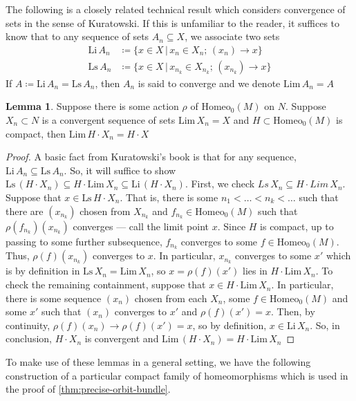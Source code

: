 \documentclass[10pt, oneside]{article}
\newcommand{\homeo}[1][S^1]{\text{Homeo}_0(#1)}
\newcommand{\klim}[1]{\text{Lim}\,#1}
\newcommand{\li}[1]{\text{Li}\,#1}
\newcommand{\ls}[1]{\text{Ls}\,#1}
\theoremstyle{definition}
\newtheorem{lem}{Lemma}[section]
\theoremstyle{definition}
\begin{document}
The following is a closely related technical result which considers convergence of sets in the sense of Kuratowski\cite{kuratowski:TopologyI}. If this is unfamiliar to the reader, it suffices to know that to any sequence of sets $A_n\subseteq X$, we associate two sets
\begin{align*}
    \li{A_n}&\coloneqq\{x\in X\,\vert\, x_n\in X_n;\, (x_n)\to x\} \\
    \ls{A_n}&\coloneqq\{x\in X\,\vert\, x_{n_k}\in X_{n_k};\, (x_{n_k})\to x\}
\end{align*}
If $A\coloneqq \li{A_n}=\ls{A_n}$, then $A_n$ is said to converge and we denote $\klim{A_n} = A$

\begin{lem}\label{lem:union-over-cpct-k-lim}
    Suppose there is some action $\rho$ of $\homeo[M]$ on $N$. Suppose $X_n \subset N$ is a convergent sequence of sets $\klim{X_n} = X$ and $H\subset\homeo[M]$ is compact, then $\klim{H\cdot X_n} = H\cdot X$
\end{lem}
\begin{proof}
    A basic fact from Kuratowski's book is that for any sequence, $\li{A_n}\subseteq\ls{A_n}$. So, it will suffice to show $\ls{(H\cdot X_n)}\subseteq H\cdot \klim{X_n}\subseteq\li{(H\cdot X_n)}$. First, we check $\mathit{\ls{X_n}\subseteq H\cdot\klim{X_n}}$. Suppose that $x\in \ls{H\cdot X_n}$. That is, there is some $n_1 < \dots < n_k < \dots$ such that there are $(x_{n_k})$ chosen from $X_{n_k}$ and $f_{n_k}\in\homeo[M]$ such that $\rho(f_{n_k})(x_{n_k})$ converges --- call the limit point $x$. Since $H$ is compact, up to passing to some further subsequence, $f_{n_k}$ converges to some $f\in\homeo[M]$. Thus, $\rho(f)(x_{n_k})$ converges to $x$. In particular, $x_{n_k}$ converges to some $x'$ which is by definition in $\ls{X_n} =\klim{X_n}$, so $x=\rho(f)(x')$ lies in $H\cdot \klim{X_n}$. To check the remaining containment, suppose that $x\in H\cdot\klim{X_n}$. In particular, there is some sequence $(x_n)$ chosen from each $X_n$, some $f\in\homeo[M]$ and some $x'$ such that $(x_n)$ converges to $x'$ and $\rho(f)(x')=x$. Then, by continuity, $\rho(f)(x_n)\to\rho(f)(x')=x$, so by definition, $x\in\li{X_n}$. So, in conclusion, $H\cdot X_n$ is convergent and $\klim{(H\cdot X_n)} = H\cdot\klim{X_n}$
\end{proof}

To make use of these lemmas in a general setting, we have the following construction of a particular compact family of homeomorphisms which is used in the proof of \cref{thm:precise-orbit-bundle}.
\end{document}
